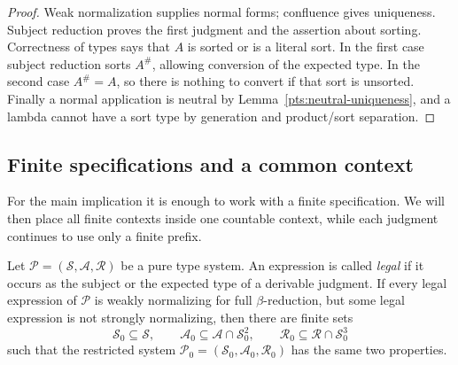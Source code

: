 \begin{proof}
Weak normalization supplies normal forms; confluence gives uniqueness.
Subject reduction proves the first judgment and the assertion about
sorting. Correctness of types says that $A$ is sorted or is a literal
sort. In the first case subject reduction sorts $A^\#$, allowing
conversion of the expected type. In the second case $A^\#=A$, so
there is nothing to convert if that sort is unsorted. Finally a
normal application is neutral by Lemma~\ref{pts:neutral-uniqueness},
and a lambda cannot have a sort type by generation and product/sort
separation.
\end{proof}

\subsection{Finite specifications and a common context}
\label{pts:finite-and-context}

For the main implication it is enough to work with a finite
specification. We will then place all finite contexts inside one
countable context, while each judgment continues to use only a finite
prefix.

\begin{lemma}\label{pts:finite-restriction}
Let $\mathcal P=(\mathcal S,\mathcal A,\mathcal R)$ be a pure type
system.  An expression is called \emph{legal} if it occurs as the subject
or the expected type of a derivable judgment.  If every legal expression
of $\mathcal P$ is weakly normalizing for full $\beta$-reduction, but some
legal expression is not strongly normalizing, then there are finite sets
\[
  \mathcal S_0\subseteq\mathcal S,\qquad
  \mathcal A_0\subseteq\mathcal A\cap\mathcal S_0^2,\qquad
  \mathcal R_0\subseteq\mathcal R\cap\mathcal S_0^3
\]
such that the restricted system
$\mathcal P_0=(\mathcal S_0,\mathcal A_0,\mathcal R_0)$ has the same two
properties.
\end{lemma}

